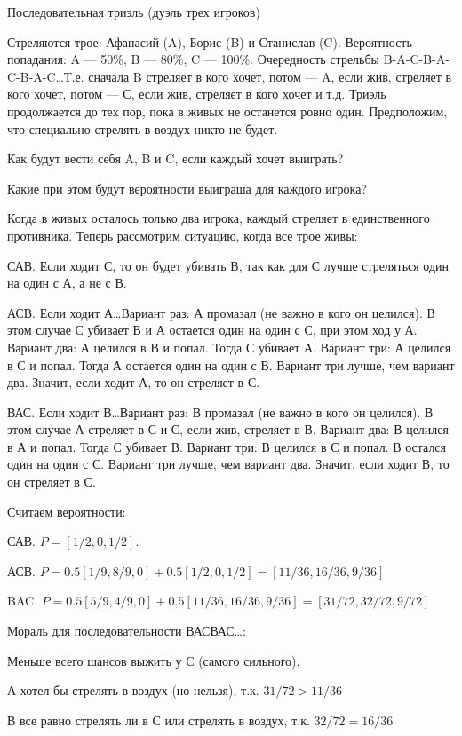 \begin{problem}
Последовательная триэль (дуэль трех игроков)

Стреляются трое: Афанасий (A), Борис (B) и Станислав (C). Вероятность попадания: A — 50\%, B — 80\%, C — 100\%. Очередность стрельбы B-A-C-B-A-C-B-A-C\ldots Т.е. сначала B стреляет в кого хочет, потом — A, если жив, стреляет в кого хочет, потом — С, если жив, стреляет в кого хочет и т.д. Триэль продолжается до тех пор, пока в живых не останется ровно один. Предположим, что специально стрелять в воздух никто не будет.

Как будут вести себя A, B и C, если каждый хочет выиграть?

Какие при этом будут вероятности выиграша для каждого игрока?



\begin{sol}
Когда в живых осталось только два игрока, каждый стреляет в единственного противника. Теперь рассмотрим ситуацию, когда все трое живы:

САВ. Если ходит С, то он будет убивать В, так как для С лучше стреляться один на один с А, а не с В.

АСВ. Если ходит А\ldots Вариант раз: А промазал (не важно в кого он целился). В этом случае С убивает В и А остается один на один с С, при этом ход у А.  Вариант два: А целился в В и попал. Тогда С убивает А. Вариант три: А целился в С и попал. Тогда А остается один на один с В. Вариант три лучше, чем вариант два. Значит, если ходит А, то он стреляет в С.

ВАС. Если ходит В\ldots Вариант раз: В промазал (не важно в кого он целился). В этом случае А стреляет в С и С, если жив, стреляет в В. Вариант два: В целился в А и попал. Тогда С убивает В. Вариант три: В целился в С и попал. В остался один на один с С. Вариант три лучше, чем вариант два. Значит, если ходит В, то он стреляет в С.

Считаем вероятности:

САВ. $P=[1/2,0,1/2]$.

АСВ. $P=0.5[1/9,8/9,0]+0.5[1/2,0,1/2]=[11/36,16/36,9/36]$

BAC. $P=0.5[5/9,4/9,0]+0.5[11/36,16/36,9/36]=[31/72,32/72,9/72]$

Мораль для последовательности ВАСВАС\ldots :

Меньше всего шансов выжить у С (самого сильного).

А хотел бы стрелять в воздух (но нельзя), т.к. $31/72>11/36$

В все равно стрелять ли в С или стрелять в воздух, т.к. $32/72=16/36$
\end{sol}
\end{problem}






